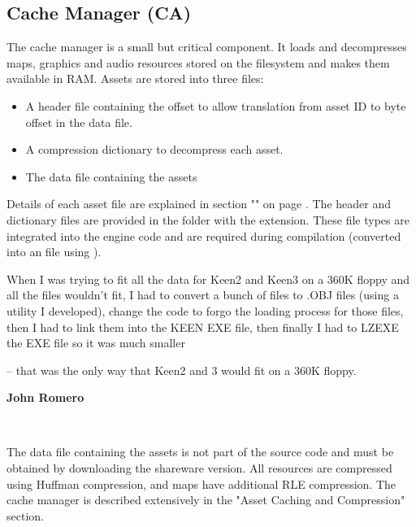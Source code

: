 \documentclass[book.tex]{subfiles}
\begin{document}
\subsection{Cache Manager (CA)}
The cache manager is a small but critical component. It loads and decompresses maps, graphics and audio resources stored on the filesystem and makes them available in RAM. Assets are stored into three files: 
\begin{itemize}
	\item A header file containing the offset to allow translation from asset ID to byte offset in the data file.
	\item A compression dictionary to decompress each asset.
	\item The data file containing the assets
\end{itemize}

\par
Details of each asset file are explained in section "" on page \pageref{section:programming}. The header and dictionary files are provided in the  folder with the  extension. These file types are integrated into the engine code and are required during compilation (converted into an  file using ). \\

\par
\begin{fancyquotes}
When I was trying to fit all the data for Keen2 and Keen3 on a 360K floppy and all the files wouldn't fit, I had to convert a bunch of files to .OBJ files (using a utility I developed), change the code to forgo the loading process for those files, then I had to link them into the KEEN EXE file, then finally I had to LZEXE the EXE file so it was much smaller\\ 
\par
-- that was the only way that Keen2 and 3 would fit on a 360K floppy.\\

\par
\textbf{John Romero\protect\footnotemark}
\end{fancyquotes}\\
\addtocounter{footnote}{-1}


\pagebreak
The data file containing the assets is not part of the source code and must be obtained by downloading the shareware version. All resources are compressed using Huffman compression, and maps have additional RLE compression. The cache manager is described extensively in the "Asset Caching and Compression" section.\\
\end{document}
